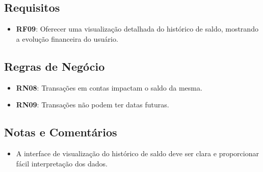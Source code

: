 \subsection*{Requisitos}
\begin{addmargin}[1.5cm]{0cm}
	\begin{itemize}
        \item \textbf{RF09}: Oferecer uma visualização detalhada do histórico de saldo, mostrando a evolução financeira do usuário.
	\end{itemize}
\end{addmargin}

\subsection*{Regras de Negócio}
\begin{addmargin}[1.5cm]{0cm}
    \begin{itemize}
        \item \textbf{RN08}: Transações em contas impactam o saldo da mesma.
        \item \textbf{RN09}: Transações não podem ter datas futuras.
    \end{itemize}
\end{addmargin}

\subsection*{Notas e Comentários}
\begin{addmargin}[1.5cm]{0cm}
    \begin{itemize}
        \item A interface de visualização do histórico de saldo deve ser clara e proporcionar fácil interpretação dos dados.
    \end{itemize}
\end{addmargin}
